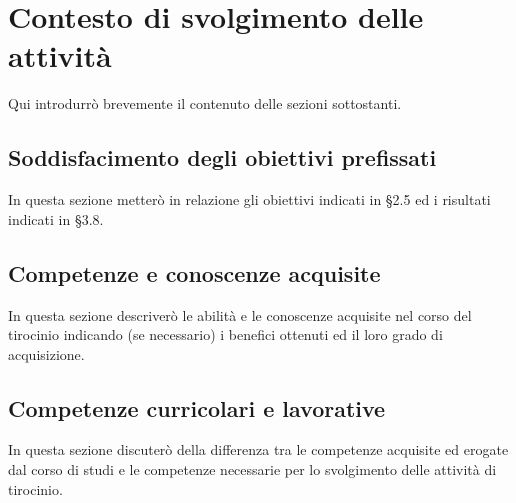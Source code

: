 \chapter{Contesto di svolgimento delle attività}
\label{cap:resoconto}
Qui introdurrò brevemente il contenuto delle sezioni sottostanti.

\section{Soddisfacimento degli obiettivi prefissati}

In questa sezione metterò in relazione gli obiettivi indicati in §2.5 ed i risultati indicati in §3.8.

\section{Competenze e conoscenze acquisite}

In questa sezione descriverò le abilità e le conoscenze acquisite nel corso del tirocinio indicando (se necessario) i benefici ottenuti ed il loro grado di acquisizione.

\section{Competenze curricolari e lavorative}

In questa sezione discuterò della differenza tra le competenze acquisite ed erogate dal corso di studi e le competenze necessarie per lo svolgimento delle attività di tirocinio.
